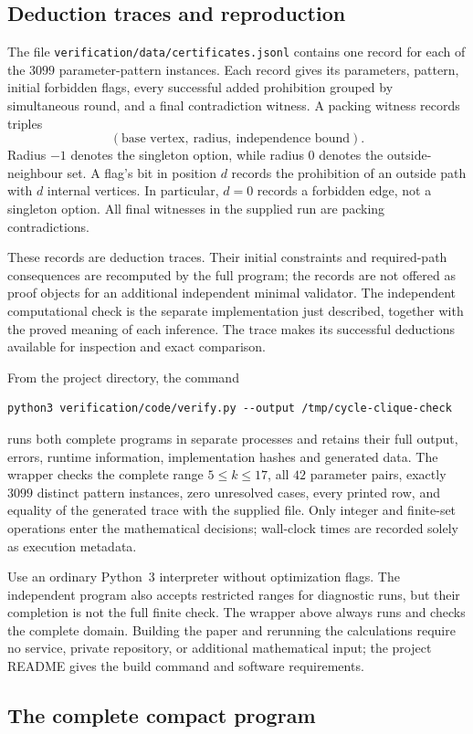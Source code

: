 \subsection{Deduction traces and reproduction}

The file \texttt{verification/data/}\allowbreak\texttt{certificates.jsonl} contains one record for each
of the $3099$ parameter-pattern instances. Each record gives its
parameters, pattern, initial forbidden flags, every successful added
prohibition grouped by simultaneous round, and a final contradiction
witness. A packing witness records triples
\[
 (\text{base vertex},\ \text{radius},\ \text{independence bound}).
\]
Radius $-1$ denotes the singleton option, while radius $0$ denotes the
outside-neighbour set. A flag's bit in position $d$
records the prohibition of an outside path with $d$ internal vertices.
In particular, $d=0$ records a forbidden edge, not a singleton option.
All final witnesses in the supplied run are packing contradictions.

These records are deduction traces. Their initial constraints and
required-path consequences are recomputed by the full program; the
records are not offered as proof objects for an additional independent
minimal validator. The independent computational check is the separate
implementation just described, together with the proved meaning of
each inference. The trace makes its successful deductions available
for inspection and exact comparison.

From the project directory, the command
\begin{lstlisting}
python3 verification/code/verify.py --output /tmp/cycle-clique-check
\end{lstlisting}
runs both complete programs in separate processes and retains their
full output, errors, runtime information, implementation hashes and
generated data. The wrapper checks the complete range $5\le k\le17$,
all $42$ parameter pairs, exactly $3099$ distinct pattern instances,
zero unresolved cases, every printed row, and equality of the generated
trace with the supplied file. Only integer and finite-set operations
enter the mathematical decisions; wall-clock times are recorded solely
as execution metadata.

Use an ordinary Python~3 interpreter without optimization flags.
The independent program also accepts restricted ranges for diagnostic
runs, but their completion is not the full finite check. The wrapper
above always runs and checks the complete domain. Building the paper
and rerunning the calculations require no service, private repository,
or additional mathematical input; the project README gives the build
command and software requirements.

\subsection{The complete compact program}



